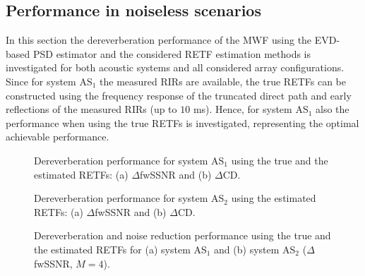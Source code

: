 \documentclass{article}
\begin{document}
\subsection{Performance in noiseless scenarios}
\label{sec: nonoise}
In this section the dereverberation performance of the MWF using the EVD-based PSD estimator and the considered RETF estimation methods is investigated for both acoustic systems and all considered array configurations.
Since for system AS$_1$ the measured RIRs are available, the true RETFs can be constructed using the frequency response of the truncated direct path and early reflections of the measured RIRs (up to $10$ ms).
Hence, for system AS$_1$ also the performance when using the true RETFs is investigated, representing the optimal achievable performance.
\begin{figure}[t]
  
  \vspace{-0.3cm}
  \caption{Dereverberation performance for system AS$_1$ using the true and the estimated RETFs: (a) $\Delta$fwSSNR and (b) $\Delta$CD.}
  \label{fig: derev1}
\end{figure}
\begin{figure}[t]
  
    \vspace{-0.3cm}
  \caption{Dereverberation performance for system AS$_2$ using the estimated RETFs: (a) $\Delta$fwSSNR and (b) $\Delta$CD.}
  \label{fig: derev2}
\end{figure}
\begin{figure}[t]
  
    \vspace{-0.3cm}
    \caption{Dereverberation and noise reduction performance using the true and the estimated RETFs for (a) system AS$_1$ and (b) system AS$_2$ ($\Delta$fwSSNR, $M = 4$).}
    \vspace{-0.3cm}
  \label{fig: nr1}
\end{figure}
\end{document}
